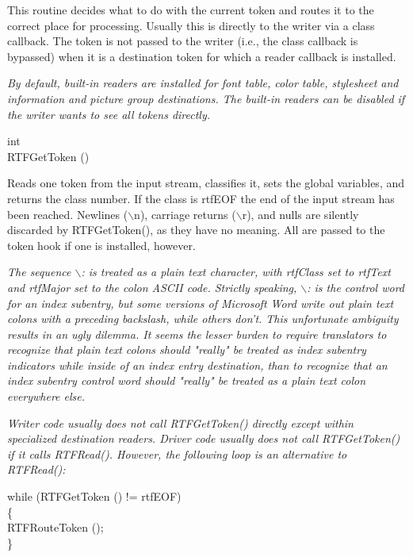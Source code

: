 \documentclass{article}
\begin{document}
\noindent
This routine decides what to do with the current token and routes it to the 
correct place for processing. Usually this is directly to the writer via 
a class callback. The token is not passed to the writer (i.e., the class 
callback is bypassed) when it is a destination token for which a reader callback 
is installed.



\noindent
{\em By default, built-in readers are installed for font table, color table, 
stylesheet and information and picture group destinations. The built-in readers 
can be disabled if the writer wants to see all tokens directly.



}
\noindent
int\\
RTFGetToken ()




\noindent
Reads one token from the input stream, classifies it, sets the global variables, 
and returns the class number. If the class is rtfEOF the end of the input 
stream has been reached. Newlines ($\backslash $n), carriage returns ($\backslash $r), 
and nulls are silently discarded by RTFGetToken(), as they have no meaning. 
All are passed to the token hook if one is installed, however.



\noindent
{\em The sequence $\backslash $: is treated as a plain text character, with 
rtfClass set to rtfText and rtfMajor set to the colon ASCII code. Strictly 
speaking, $\backslash $: is the control word for an index subentry, but some 
versions of Microsoft Word write out plain text colons with a preceding backslash, 
while others don't. This unfortunate ambiguity results in an ugly dilemma. 
It seems the lesser burden to require translators to recognize that plain 
text colons should "really" be treated as index subentry indicators while 
inside of an index entry destination, than to recognize that an index subentry 
control word should "really" be treated as a plain text colon everywhere 
else.



\noindent
{\em Writer code usually does not call RTFGetToken() directly except within 
specialized destination readers. Driver code usually does not call RTFGetToken() 
if it calls RTFRead(). However, the following loop is an alternative to RTFRead():



}}
\noindent
while (RTFGetToken () != rtfEOF)\\
\{	\\
RTFRouteToken ();\\
\}
\end{document}
